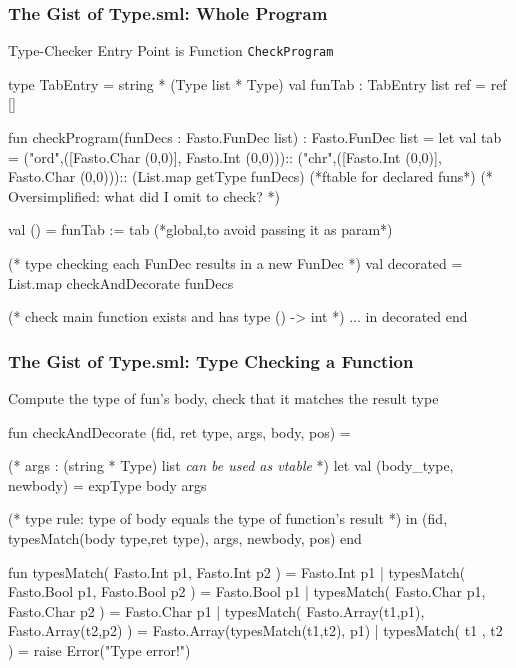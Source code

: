 \documentclass{beamer}
\renewcommand{\emph}[1]{\textcolor{structure}{#1}}
\newcommand{\emp}[1]{\textcolor{DikuRed}{ #1}}
\begin{document}
\begin{frame}[fragile,t]
    \frametitle{The Gist of Type.sml: Whole Program}



\begin{block}{Type-Checker Entry Point is Function {\tt CheckProgram}}
\begin{colorcode}[fontsize=\scriptsize]
type TabEntry = string * (Type list * Type)
val funTab : TabEntry list ref = ref []

fun checkProgram(funDecs : Fasto.FunDec list) : Fasto.FunDec list =
  let val tab = ("ord",([Fasto.Char (0,0)], Fasto.Int (0,0)))::
                ("chr",([Fasto.Int (0,0)], Fasto.Char (0,0)))::
                (List.map getType funDecs) \emp{(*ftable for declared funs*)}
      \alert{(* Oversimplified: what did I omit to check? *)}

      val () = funTab := tab \emp{(*global,to avoid passing it as param*)}

      \emp{(* type checking each FunDec results in a new FunDec *)}
      \emph{val decorated = List.map checkAndDecorate funDecs}

      (* check main function exists and has type () -> int *) ...
  in \emph{decorated}
  end
\end{colorcode} 
\end{block}

\end{frame}


\begin{frame}[fragile,t]
    \frametitle{The Gist of Type.sml: Type Checking a Function}

\begin{block}{Compute the type of fun's body, check that it matches the result type}
\begin{colorcode}[fontsize=\scriptsize]
fun checkAndDecorate (fid, ret type, args, body, pos) =

  \emp{(* args : (string * Type) list {\em can be used as vtable} *)}
  let val \emph{(body_type, newbody) = expType body args}

  \emp{(* type rule: type of body equals the type of function's result *)}
  in (fid, \emph{typesMatch(body type,ret type)}, args, \emph{newbody}, pos)
  end


fun \emph{typesMatch}( Fasto.Int  p1, Fasto.Int  p2 ) = \emph{Fasto.Int  p1}
  | typesMatch( Fasto.Bool p1, Fasto.Bool p2 ) = \emph{Fasto.Bool p1}
  | typesMatch( Fasto.Char p1, Fasto.Char p2 ) = \emph{Fasto.Char p1}
  | typesMatch( Fasto.Array(t1,p1), Fasto.Array(t2,p2) ) =
                             \emph{Fasto.Array(typesMatch(t1,t2), p1)}
  | typesMatch( t1 , t2 ) = \alert{raise Error("Type error!")}
\end{colorcode} 
\end{block}

\end{frame}
\end{document}
